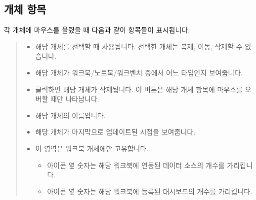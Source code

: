 \documentclass[letterpaper,10pt,english]{sphinxmanual}
\begin{document}
\subsection{개체 항목}
\label{\detokenize{discovery/part03/workspace_management:items}}\label{\detokenize{discovery/part03/workspace_management:id4}}
각 개체에 마우스를 올렸을 때 다음과 같이 항목들이 표시됩니다.
\begin{quote}

\begin{figure}[H]
\centering

\noindent{}
\end{figure}
\begin{itemize}
\item {} 
 해당 개체를 선택할 때 사용됩니다. 선택한 개체는 복제, 이동, 삭제할 수 있습니다.

\item {} 
 해당 개체가 워크북/노트북/워크벤치 중에서 어느 타입인지 보여줍니다.

\item {} 
 클릭하면 해당 개체가 삭제됩니다. 이 버튼은 해당 개체 항목에 마우스를 오버할 때만 나타납니다.

\item {} 
 해당 개체의 이름입니다.

\item {} 
 해당 개체가 마지막으로 업데이트된 시점을 보여줍니다.

\item {} 
 이 영역은 워크북 개체에만 고유합니다.
\begin{itemize}
\item {} 
 아이콘 옆 숫자는 해당 워크북에 연동된 데이터 소스의 개수를 가리킵니다.

\item {} 
 아이콘 옆 숫자는 해당 워크북에 등록된 대시보드의 개수를 가리킵니다.

\end{itemize}

\end{itemize}
\end{quote}
\end{document}
